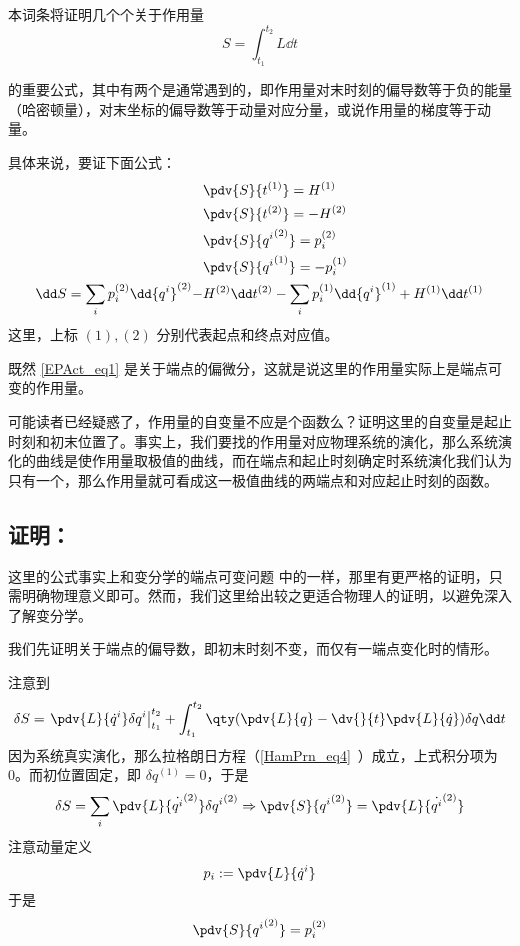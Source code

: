 本词条将证明几个个关于作用量
\begin{equation}
S=\int_{t_1}^{t_2}L\dd t
\end{equation}

的重要公式，其中有两个是通常遇到的，即作用量对末时刻的偏导数等于负的能量（哈密顿量），对末坐标的偏导数等于动量对应分量，或说作用量的梯度等于动量。

具体来说，要证下面公式：
\begin{equation}\label{EPAct_eq1}
\begin{aligned}
&\pdv{S}{t^{(1)}}=H^{(1)}\\
&\pdv{S}{t^{(2)}}=-H^{(2)}\\
&\pdv{S}{{q^i}^{(2)}}=p_i^{(2)}\\
&\pdv{S}{{q^i}^{(1)}}=-p_i^{(1)}\\
\dd S=\sum_i p_i^{(2)}\dd {q^i}^{(2)}-&H^{(2)}\dd t^{(2)}-\sum_i p_i^{(1)}\dd {q^i}^{(1)}+H^{(1)}\dd t^{(1)}
\end{aligned}
\end{equation}
这里，上标 $(1),(2)$ 分别代表起点和终点对应值。

既然 \autoref{EPAct_eq1} 是关于端点的偏微分，这就是说这里的作用量实际上是端点可变的作用量。

可能读者已经疑惑了，作用量的自变量不应是个函数么？证明这里的自变量是起止时刻和初末位置了。事实上，我们要找的作用量对应物理系统的演化，那么系统演化的曲线是使作用量取极值的曲线，而在端点和起止时刻确定时系统演化我们认为只有一个，那么作用量就可看成这一极值曲线的两端点和对应起止时刻的函数。
\subsection{证明：}
这里的公式事实上和变分学的端点可变问题 中的一样，那里有更严格的证明，只需明确物理意义即可。然而，我们这里给出较之更适合物理人的证明，以避免深入了解变分学。

我们先证明关于端点的偏导数，即初末时刻不变，而仅有一端点变化时的情形。

注意到
\begin{equation}
\delta S=\left.\pdv{L}{\dot q^i}\delta q^i\right|_{t_1}^{t_2}+\int_{t_1}^{t_2}\qty(\pdv{L}{q}-\dv{}{t}\pdv{L}{\dot q})\delta q\dd t
\end{equation}
因为系统真实演化，那么拉格朗日方程（\autoref{HamPrn_eq4}~）成立，上式积分项为0。而初位置固定，即 $\delta q^{(1)}=0$，于是
\begin{equation}
\delta S=\sum_i\pdv{L}{\dot {q^i}^{(2)}}\delta {q^i}^{(2)}\Rightarrow \pdv{S}{{q^i}^{(2)}}=\pdv{L}{\dot {q^i}^{(2)}}
\end{equation}
注意动量定义
\begin{equation}
p_i:=\pdv{L}{\dot q^i}
\end{equation}
于是
\begin{equation}
\pdv{S}{{q^i}^{(2)}}=p_i^{(2)}
\end{equation}

